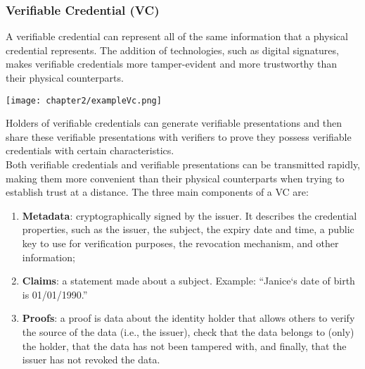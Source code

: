 \subsubsection{Verifiable Credential (VC)}
A verifiable credential\cite{site:w3cvc} can represent all of the same information that a physical 
credential represents. The addition of technologies, such as digital signatures, 
makes verifiable credentials more tamper-evident and more trustworthy than their 
physical counterparts.\\
\begin{center}
    \vspace{-0.5cm}
    \texttt{[image: chapter2/exampleVc.png]}
    \vspace{-0.3cm}
\end{center}
Holders of verifiable credentials can generate verifiable presentations and then share 
these verifiable presentations with verifiers to prove they possess verifiable 
credentials with certain characteristics.\\
Both verifiable credentials and verifiable presentations can be transmitted rapidly, 
making them more convenient than their physical counterparts when trying to establish 
trust at a distance.
The three main components of a VC are:
\begin{enumerate}
    \item \textbf{Metadata}: cryptographically signed by the issuer. It describes the credential
    properties, such as the issuer, the subject, the expiry date and time, a public key 
    to use for verification purposes, the revocation mechanism, and other information;
    \item \textbf{Claims}: a statement made about a subject. Example: “Janice`s date of 
    birth is 01/01/1990.”
    \item \textbf{Proofs}: a proof is data about the identity holder that allows others 
    to verify the source of the data (i.e., the issuer), check that the data belongs to 
    (only) the holder, that the data has not been tampered with, and finally, that the 
    issuer has not revoked the data.
\end{enumerate}

